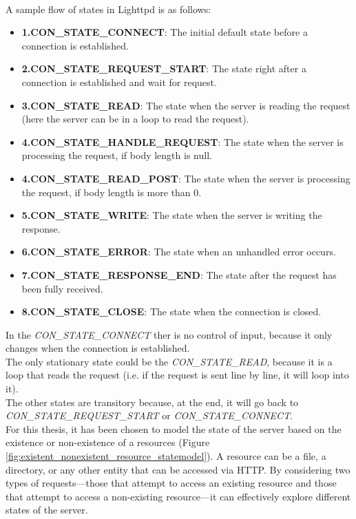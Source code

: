 \\A sample flow of states in Lighttpd is as follows:
\begin{itemize}
    \item \textbf{1.CON\_STATE\_CONNECT}: The initial default state before a connection is established.
    
    \item \textbf{2.CON\_STATE\_REQUEST\_START}: The state right after a connection is established and wait for request.
    
    \item \textbf{3.CON\_STATE\_READ}: The state when the server is reading the request (here the server can be in a loop to read the request).
    
    \item \textbf{4.CON\_STATE\_HANDLE\_REQUEST}: The state when the server is processing the request, if body length is null.
    
    \item \textbf{4.CON\_STATE\_READ\_POST}: The state when the server is processing the request, if body length is more than 0.
    
    \item \textbf{5.CON\_STATE\_WRITE}: The state when the server is writing the response.
    \item \textbf{6.CON\_STATE\_ERROR}: The state when an unhandled error occurs.
    
    \item \textbf{7.CON\_STATE\_RESPONSE\_END}: The state after the request has been fully received.
    
    \item \textbf{8.CON\_STATE\_CLOSE}: The state when the connection is closed.
\end{itemize}
In the \textit{CON\_STATE\_CONNECT} ther is no control of input, because it only changes when the connection is established.
\\The only stationary state could be the \textit{CON\_STATE\_READ}, because it is a loop that reads the request (i.e. if the request is sent line by line, it will loop into it).
\\The other states are transitory because, at the end, it will go back to \textit{CON\_STATE\_REQUEST\_START} or \textit{CON\_STATE\_CONNECT}.
\\For this thesis, it has been chosen to model the state of the server based on the existence or non-existence of a resources (Figure \ref{fig:existent_nonexistent_resource_statemodel}). A resource can be a file, a directory, or any other entity that can be accessed via HTTP. By considering two types of requests—those that attempt to access an existing resource and those that attempt to access a non-existing resource—it can effectively explore different states of the server.

